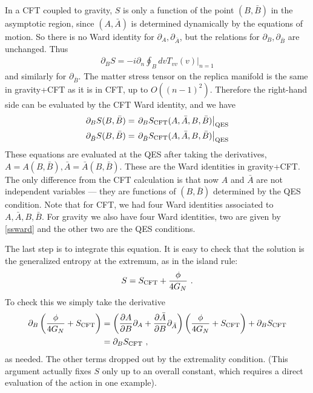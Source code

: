 \documentclass[11pt,oneside,letterpaper]{article}
\newcommand{\p}{\partial}
\newcommand{\f}{\frac}
\newcommand{\be}{\begin{equation}}
\newcommand{\ee}{\end{equation}}
\def\be{\begin{eqnarray}}
\def\ee{\end{eqnarray}}
\let\l=\lambda \let\m=\mu \let\n=\nu \let\x=\xi \let\p=\phi \let\r=v
\let\f=\frac
\def\be{\begin{equation}}
\def\ee{\end{equation}}
\renewcommand{\p}{\partial}
\numberwithin{equation}{section}
\def\m{{\mu}}
\def\n{{\nu}}
\def\p{{\phi}}
\newcommand{\bv}{\bar{v}}
\newcommand{\bz}{\bar{z}}
\def\be{\begin{equation}}
\def\ee{\end{equation}}
\def\r{\rightarrow}
\def\f {\frac}
\def\l{\left}
\def\r{\right}
\def\x{\bar{x}}
\def \be {\begin{equation}}
\def \ee {\end{equation}}
\renewcommand{\p}{\partial}
\begin{document}
\begin{spacing}{1.1}
In a CFT coupled to gravity, $S$ is only a function of the point $(B,\bar{B})$ in the asymptotic region, since $(A,\bar{A})$ is determined dynamically by the equations of motion. So there is no Ward identity for $\p_A, \p_{\bar{A}}$, but the relations for $\p_B, \p_{\bar{B}}$ are unchanged. Thus
\begin{align}
\p_B S = -i \p_n \oint_B dv T_{vv}(v)|_{n=1}  
\end{align}
and similarly for $\p_{\bar{B}}$.
The matter stress tensor on the replica manifold is the same in gravity+CFT as it is in CFT, up to $O((n-1)^2)$. Therefore the right-hand side can be evaluated by the CFT Ward identity, and we have
\begin{align}\label{ssward}
\p_B S(B, \bar{B}) &= \left.\p_B S_{\rm CFT}(A,\bar{A}, B, \bar{B})\right|_{\rm QES} \\
\p_{\bar{B}} S(B, \bar{B}) &= \left.\p_{\bar{B}} S_{\rm CFT}(A,\bar{A}, B, \bar{B})\right|_{\rm QES} \notag
\end{align}
These equations are evaluated at the QES after taking the derivatives, $A = A(B,\bar{B}), \bar{A} = \bar{A}(B,\bar{B})$.
These are the Ward identities in gravity+CFT. The only difference from the CFT calculation is that now $A$ and $\bar{A}$ are not independent variables --- they are functions of $(B,\bar{B})$ determined by the QES condition. Note that for CFT, we had four Ward identities associated to $A, \bar{A}, B, \bar{B}$. For gravity we also have four Ward identities, two are given by \eqref{ssward} and the other two are the QES conditions.

The last step is to integrate this equation. It is easy to check that the solution is the generalized entropy at the extremum, as in the island rule:
\be
S = S_{\rm CFT}+\f{\phi}{4G_N}  \  .
\ee
To check this we simply take the derivative
\begin{align}
\p_B \left(\f{\phi}{4G_N}+ S_{\rm CFT} \right) &= 
\l(\frac{\p A}{\p B} \p_A  + \frac{\p\bar{A}}{\p B}\p_{\bar{A}}\r)\l(\f{\phi}{4G_N} + S_{\rm CFT}\r) + 
\p_B S_{\rm CFT}\\
&= \p_B S_{\rm CFT} \ , \notag
\end{align}
as needed.
The other terms dropped out by the extremality condition. (This argument actually fixes $S$ only up to an overall constant, which requires a direct evaluation of the action in one example).



\end{spacing}
\end{document}
